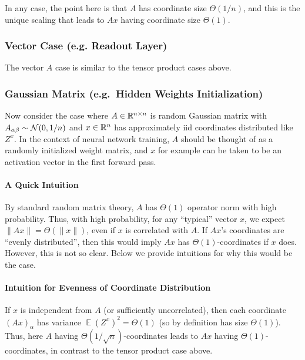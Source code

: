 \documentclass{article}
\theoremstyle{definition}
\DeclareMathOperator*{\EV}{\mathbb{E}}
\begin{document}
    In any case, the point here is that $A$ has coordinate size $\Theta(1/n)$, and this is the unique scaling that leads to $Ax$ having coordinate size $\Theta(1)$.
    
    \subsubsection{Vector Case (e.g. Readout Layer)}
    
    The vector $A$ case is similar to the tensor product cases above.
    
    \subsubsection{Gaussian Matrix (e.g.\ Hidden Weights Initialization)}
    
    Now consider the case where $A\in\mathbb{R}^{n\times n}$ is random Gaussian matrix with $A_{\alpha\beta}\sim\mathcal{N}(0,1/n)$ and $x\in\mathbb{R}^{n}$ has approximately iid coordinates distributed like $Z^{x}$. In the context of neural network training, $A$ should be thought of as a randomly initialized weight matrix, and $x$ for example can be taken to be an activation vector in the first forward pass.

    \paragraph{A Quick Intuition}
    By standard random matrix theory, $A$ has $\Theta(1)$ operator norm with high probability.
    Thus, with high probability, for any ``typical'' vector $x$, we expect $\|Ax\|= \Theta(\|x\|)$, even if $x$ is correlated with $A$.
    If $Ax$'s coordinates are ``evenly distributed'', then this would imply $Ax$ has $\Theta(1)$-coordinates if $x$ does.
    However, this is not so clear.
    Below we provide intuitions for why this would be the case.
    
    \paragraph{Intuition for Evenness of Coordinate Distribution}
    If $x$ is independent from $A$ (or sufficiently uncorrelated), then each coordinate $(Ax)_{\alpha}$ has variance $\EV(Z^{x})^{2}=\Theta(1)$ (so by definition has size $\Theta(1)$). Thus, here $A$ having $\Theta(1/\sqrt{n})$-coordinates leads to $Ax$ having $\Theta(1)$-coordinates, in contrast to the tensor product case above.
    
\end{document}
